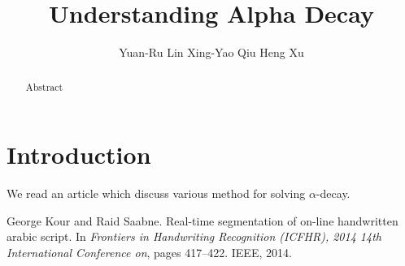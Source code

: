 \documentclass{article}
\title{Understanding Alpha Decay}
\author{
  Yuan-Ru Lin
   \And
  Xing-Yao Qiu
   \And
  Heng Xu
}
\begin{document}
\maketitle

\begin{abstract}
Abstract
\end{abstract}

\section{Introduction}
We read an article which discuss various method for solving $\alpha$-decay. \cite{understandingAlphaDecay}


  
\begin{thebibliography}{1}
George Kour and Raid Saabne.
\newblock Real-time segmentation of on-line handwritten arabic script.
\newblock In {\em Frontiers in Handwriting Recognition (ICFHR), 2014 14th
  International Conference on}, pages 417--422. IEEE, 2014.

\end{thebibliography}
\end{document}
